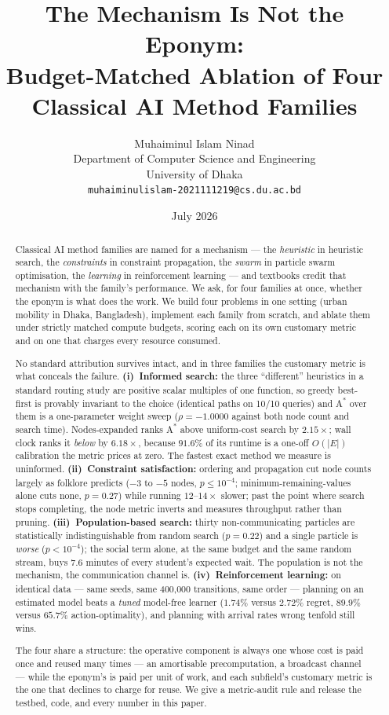 \documentclass[11pt]{article}
\title{\bfseries The Mechanism Is Not the Eponym:\\
Budget-Matched Ablation of Four Classical AI Method Families}
\author{%
  Muhaiminul Islam Ninad\\
  \small Department of Computer Science and Engineering\\
  \small University of Dhaka\\
  \small \texttt{muhaiminulislam-2021111219@cs.du.ac.bd}
}
\date{July 2026}
\begin{document}
\maketitle

\begin{abstract}
Classical AI method families are named for a mechanism --- the \emph{heuristic} in heuristic
search, the \emph{constraints} in constraint propagation, the \emph{swarm} in particle swarm
optimisation, the \emph{learning} in reinforcement learning --- and textbooks credit that
mechanism with the family's performance. We ask, for four families at once, whether the eponym is
what does the work. We build four problems in one setting (urban mobility in Dhaka, Bangladesh),
implement each family from scratch, and ablate them under strictly matched compute budgets,
scoring each on its own customary metric and on one that charges every resource consumed.

No standard attribution survives intact, and in three families the customary metric is what
conceals the failure. \textbf{(i)~Informed search:} the three ``different'' heuristics in a
standard routing study are positive scalar multiples of one function, so greedy best-first is
provably invariant to the choice (identical paths on 10/10 queries) and $\mathrm{A}^*$ over them is
a one-parameter weight sweep ($\rho = -1.0000$ against both node count and search time).
Nodes-expanded ranks $\mathrm{A}^*$ above uniform-cost search by $2.15\times$; wall clock ranks it
\emph{below} by $6.18\times$, because $91.6\%$ of its runtime is a one-off $O(|E|)$ calibration the
metric prices at zero. The fastest exact method we measure is uninformed.
\textbf{(ii)~Constraint satisfaction:} ordering and propagation cut node counts largely as folklore
predicts ($-3$ to $-5$ nodes, $p \le 10^{-4}$; minimum-remaining-values alone cuts none,
$p = 0.27$) while running $12$--$14\times$ slower; past the point where search stops completing,
the node metric inverts and measures throughput rather than pruning.
\textbf{(iii)~Population-based search:} thirty non-communicating particles are statistically
indistinguishable from random search ($p = 0.22$) and a single particle is \emph{worse}
($p < 10^{-4}$); the social term alone, at the same budget and the same random stream, buys $7.6$
minutes of every student's expected wait. The population is not the mechanism, the communication
channel is. \textbf{(iv)~Reinforcement learning:} on identical data --- same seeds, same
400{,}000 transitions, same order --- planning on an estimated model beats a \emph{tuned}
model-free learner ($1.74\%$ versus $2.72\%$ regret, $89.9\%$ versus $65.7\%$ action-optimality),
and planning with arrival rates wrong tenfold still wins.

The four share a structure: the operative component is always one whose cost is paid once and
reused many times --- an amortisable precomputation, a broadcast channel --- while the eponym's is
paid per unit of work, and each subfield's customary metric is the one that declines to charge for
reuse. We give a metric-audit rule and release the testbed, code, and every number in this paper.
\end{abstract}
\end{document}
